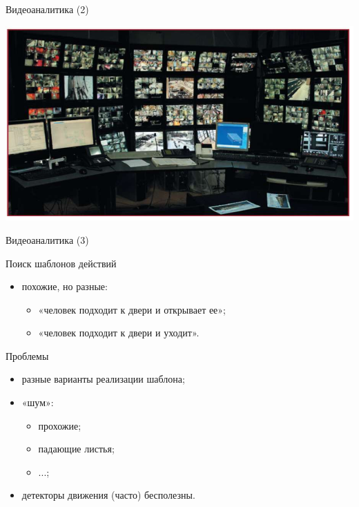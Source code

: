 \begin{frame}{Видеоаналитика (2)}
    \begin{center}
        \includegraphics[width=\textwidth]{img/video/cctv.jpg}
    \end{center}
\end{frame}

\begin{frame}{Видеоаналитика (3)}
 
    \begin{gray-box}{Поиск шаблонов действий}
        \begin{itemize}
            \item похожие, но разные:
            \begin{itemize}
                \item «человек подходит к двери и открывает ее»;
                \item «человек подходит к двери и уходит».
            \end{itemize}
        \end{itemize}
    \end{gray-box}
    \vspace{2em}
    \begin{orange-box}{Проблемы}
        \begin{itemize}
            \item разные варианты реализации шаблона;
            \item «шум»:
            \begin{itemize}
                \item прохожие;
                \item падающие листья;
                \item ...;
            \end{itemize}
            \item детекторы движения (часто) бесполезны.
        \end{itemize}
    \end{orange-box}
\end{frame}


